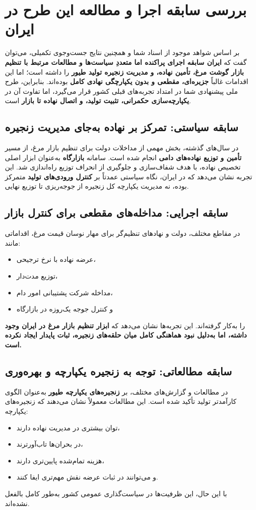 \documentclass[12pt,a4paper]{report}
\begin{document}
\chapter{بررسی سابقه اجرا و مطالعه این طرح در ایران}
بر اساس شواهد موجود از اسناد شما و همچنین نتایج جست‌وجوی تکمیلی، می‌توان گفت که \textbf{ایران سابقه اجرای پراکنده اما متعددِ سیاست‌ها و مطالعات مرتبط با تنظیم بازار گوشت مرغ، تأمین نهاده، و مدیریت زنجیره تولید طیور} را داشته است؛ اما این اقدامات غالباً \textbf{جزیره‌ای، مقطعی و بدون یکپارچگی نهادی کامل} بوده‌اند.
بنابراین، طرح ملی پیشنهادی شما در امتداد تجربه‌های قبلی کشور قرار می‌گیرد، اما تفاوت آن در \textbf{یکپارچه‌سازی حکمرانی، تثبیت تولید، و اتصال نهاده تا بازار} است.

\section{سابقه سیاستی: تمرکز بر نهاده به‌جای مدیریت زنجیره}
در سال‌های گذشته، بخش مهمی از مداخلات دولت برای تنظیم بازار مرغ، از مسیر \textbf{تأمین و توزیع نهاده‌های دامی} انجام شده است. سامانه \textbf{بازارگاه} به‌عنوان ابزار اصلی تخصیص نهاده، با هدف شفاف‌سازی و جلوگیری از انحراف توزیع راه‌اندازی شد. این تجربه نشان می‌دهد که در ایران، نگاه سیاستی عمدتاً بر \textbf{کنترل ورودی‌های تولید} متمرکز بوده، نه مدیریت یکپارچه کل زنجیره از جوجه‌ریزی تا توزیع نهایی.

\section{سابقه اجرایی: مداخله‌های مقطعی برای کنترل بازار}
در مقاطع مختلف، دولت و نهادهای تنظیم‌گر برای مهار نوسان قیمت مرغ، اقداماتی مانند:
\begin{itemize}
    \item عرضه نهاده با نرخ ترجیحی،
    \item توزیع مدت‌دار،
    \item مداخله شرکت پشتیبانی امور دام،
    \item و کنترل جوجه یک‌روزه در بازارگاه
\end{itemize}
را به‌کار گرفته‌اند. این تجربه‌ها نشان می‌دهد که \textbf{ابزار تنظیم بازار مرغ در ایران وجود داشته، اما به‌دلیل نبود هماهنگی کامل میان حلقه‌های زنجیره، ثبات پایدار ایجاد نکرده است.}

\section{سابقه مطالعاتی: توجه به زنجیره یکپارچه و بهره‌وری}
در مطالعات و گزارش‌های مختلف، بر \textbf{زنجیره‌های یکپارچه طیور} به‌عنوان الگوی کارآمدتر تولید تأکید شده است. این مطالعات معمولاً نشان می‌دهند که زنجیره‌های یکپارچه:
\begin{itemize}
    \item توان بیشتری در مدیریت نهاده دارند،
    \item در بحران‌ها تاب‌آورترند،
    \item هزینه تمام‌شده پایین‌تری دارند،
    \item و می‌توانند در ثبات عرضه نقش مهم‌تری ایفا کنند.
\end{itemize}
با این حال، این ظرفیت‌ها در سیاست‌گذاری عمومی کشور به‌طور کامل بالفعل نشده‌اند.
\end{document}

